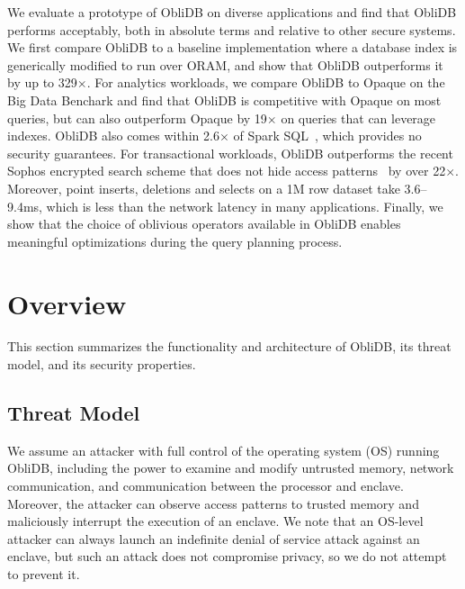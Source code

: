 \documentclass[letterpaper,twocolumn,10pt]{article}
\def\name/{ObliDB}
\begin{document}
We evaluate a prototype of \name/ on diverse applications and find that \name/ performs acceptably, both in absolute terms and relative to other secure systems.
We first compare \name/ to a baseline implementation where a database index is generically modified to run over ORAM, and show that \name/ outperforms it by up to 329$\times$.
For analytics workloads, we compare \name/ to Opaque on the Big Data Benchark\cite{BDB} and find that \name/ is competitive with Opaque on most queries, but can also outperform Opaque by 19$\times$ on queries that can leverage indexes.
\name/ also comes within 2.6$\times$ of Spark SQL~\cite{SparkSQL}, which provides no security guarantees.
For transactional workloads, \name/ outperforms the recent Sophos encrypted search scheme that does not hide access patterns~\cite{Bost16} by over 22$\times$.
Moreover, point inserts, deletions and selects on a 1M row dataset take 3.6--9.4ms,
which is less than the network latency in many applications.
Finally, we show that the choice of oblivious operators available in \name/ enables meaningful optimizations during the query planning process.


\section{Overview}\label{model}
This section summarizes the functionality and architecture of \name/, its threat model, and its security properties.

\subsection{Threat Model}
We assume an attacker with full control of the operating system (OS) running \name/, including the power to examine and modify untrusted memory, network communication, and communication between the processor and enclave. Moreover, the attacker can observe access patterns to trusted memory and maliciously  interrupt the execution of an enclave. We note that an OS-level attacker can always launch an indefinite denial of service attack against an enclave, but such an attack does not compromise privacy, so we do not attempt to prevent it.
\end{document}
